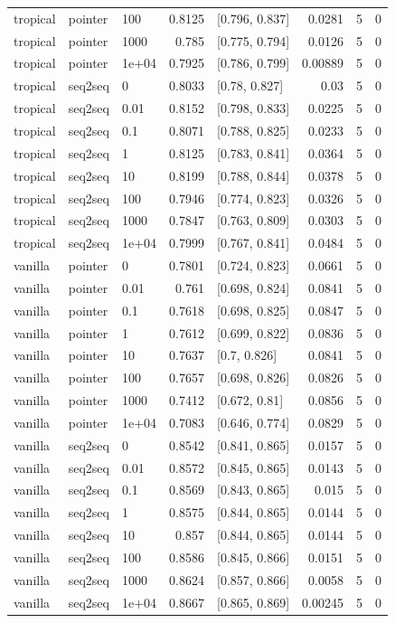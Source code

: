 \documentclass[10pt]{article}
\begin{document}
{\begin{longtable}{lllrlrrr}
tropical & pointer & 100 & 0.8125 & [0.796, 0.837] & 0.0281 & 5 & 0\\
tropical & pointer & 1000 & 0.785 & [0.775, 0.794] & 0.0126 & 5 & 0\\
tropical & pointer & 1e+04 & 0.7925 & [0.786, 0.799] & 0.00889 & 5 & 0\\
tropical & seq2seq & 0 & 0.8033 & [0.78, 0.827] & 0.03 & 5 & 0\\
tropical & seq2seq & 0.01 & 0.8152 & [0.798, 0.833] & 0.0225 & 5 & 0\\
tropical & seq2seq & 0.1 & 0.8071 & [0.788, 0.825] & 0.0233 & 5 & 0\\
tropical & seq2seq & 1 & 0.8125 & [0.783, 0.841] & 0.0364 & 5 & 0\\
tropical & seq2seq & 10 & 0.8199 & [0.788, 0.844] & 0.0378 & 5 & 0\\
tropical & seq2seq & 100 & 0.7946 & [0.774, 0.823] & 0.0326 & 5 & 0\\
tropical & seq2seq & 1000 & 0.7847 & [0.763, 0.809] & 0.0303 & 5 & 0\\
tropical & seq2seq & 1e+04 & 0.7999 & [0.767, 0.841] & 0.0484 & 5 & 0\\
vanilla & pointer & 0 & 0.7801 & [0.724, 0.823] & 0.0661 & 5 & 0\\
vanilla & pointer & 0.01 & 0.761 & [0.698, 0.824] & 0.0841 & 5 & 0\\
vanilla & pointer & 0.1 & 0.7618 & [0.698, 0.825] & 0.0847 & 5 & 0\\
vanilla & pointer & 1 & 0.7612 & [0.699, 0.822] & 0.0836 & 5 & 0\\
vanilla & pointer & 10 & 0.7637 & [0.7, 0.826] & 0.0841 & 5 & 0\\
vanilla & pointer & 100 & 0.7657 & [0.698, 0.826] & 0.0826 & 5 & 0\\
vanilla & pointer & 1000 & 0.7412 & [0.672, 0.81] & 0.0856 & 5 & 0\\
vanilla & pointer & 1e+04 & 0.7083 & [0.646, 0.774] & 0.0829 & 5 & 0\\
vanilla & seq2seq & 0 & 0.8542 & [0.841, 0.865] & 0.0157 & 5 & 0\\
vanilla & seq2seq & 0.01 & 0.8572 & [0.845, 0.865] & 0.0143 & 5 & 0\\
vanilla & seq2seq & 0.1 & 0.8569 & [0.843, 0.865] & 0.015 & 5 & 0\\
vanilla & seq2seq & 1 & 0.8575 & [0.844, 0.865] & 0.0144 & 5 & 0\\
vanilla & seq2seq & 10 & 0.857 & [0.844, 0.865] & 0.0144 & 5 & 0\\
vanilla & seq2seq & 100 & 0.8586 & [0.845, 0.866] & 0.0151 & 5 & 0\\
vanilla & seq2seq & 1000 & 0.8624 & [0.857, 0.866] & 0.0058 & 5 & 0\\
vanilla & seq2seq & 1e+04 & 0.8667 & [0.865, 0.869] & 0.00245 & 5 & 0\\
\bottomrule
\end{longtable}
}
\end{document}
